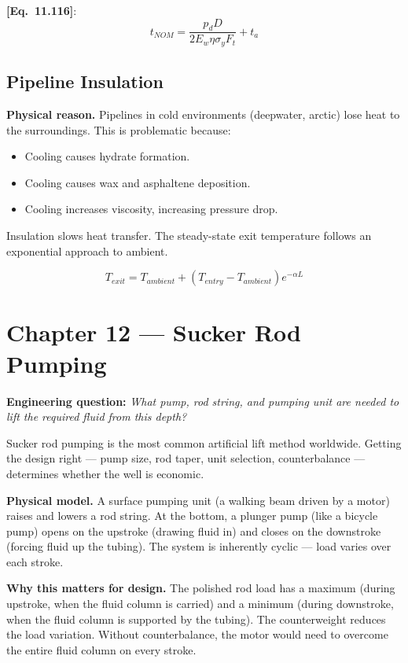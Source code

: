 \documentclass[11pt,a4paper,openany]{book}
\newcommand{\eqrefbook}[1]{\textcolor{blue!60!black}{\textbf{[Eq.~#1]}}}
\begin{document}
\eqrefbook{11.116}:
\begin{equation}
  t_{NOM} = \frac{p_d D}{2 E_w \eta \sigma_y F_t} + t_a
\end{equation}

\section{Pipeline Insulation}

\begin{theory}
\textbf{Physical reason.} Pipelines in cold environments (deepwater,
arctic) lose heat to the surroundings. This is problematic because:
\begin{itemize}
  \item Cooling causes hydrate formation.
  \item Cooling causes wax and asphaltene deposition.
  \item Cooling increases viscosity, increasing pressure drop.
\end{itemize}

Insulation slows heat transfer. The steady-state exit temperature
follows an exponential approach to ambient.
\end{theory}

\begin{equation}
  T_{exit} = T_{ambient} + (T_{entry} - T_{ambient})e^{-\alpha L}
\end{equation}

\chapter{Chapter 12 — Sucker Rod Pumping}

\begin{purpose}
\textbf{Engineering question:} \emph{What pump, rod string, and
pumping unit are needed to lift the required fluid from this depth?}

Sucker rod pumping is the most common artificial lift method worldwide.
Getting the design right — pump size, rod taper, unit selection,
counterbalance — determines whether the well is economic.
\end{purpose}

\begin{theory}
\textbf{Physical model.} A surface pumping unit (a walking beam driven
by a motor) raises and lowers a rod string. At the bottom, a plunger
pump (like a bicycle pump) opens on the upstroke (drawing fluid in)
and closes on the downstroke (forcing fluid up the tubing). The
system is inherently cyclic — load varies over each stroke.

\textbf{Why this matters for design.} The polished rod load has a
maximum (during upstroke, when the fluid column is carried) and a
minimum (during downstroke, when the fluid column is supported by the
tubing). The counterweight reduces the load variation. Without
counterbalance, the motor would need to overcome the entire fluid
column on every stroke.
\end{theory}
\end{document}

